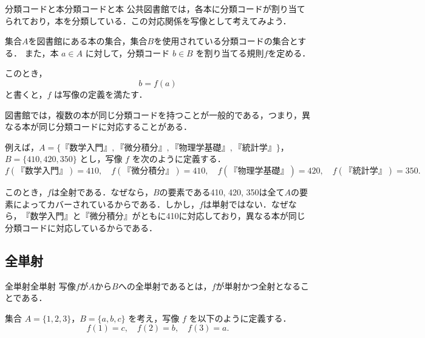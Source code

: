 \begin{example}{分類コードと本}{分類コードと本}
  公共図書館では，各本に分類コードが割り当てられており，本を分類している．この対応関係を写像として考えてみよう．

  集合$A$を図書館にある本の集合，集合$B$を使用されている分類コードの集合とする．
  また，本 $a \in A$ に対して，分類コード $b \in B$ を割り当てる規則$f$を定める．

  このとき，
  \[
    b = f(a)
  \]
  と書くと，$f$ は写像の定義を満たす．

  図書館では，複数の本が同じ分類コードを持つことが一般的である，つまり，異なる本が同じ分類コードに対応することがある．

  例えば，$A = \{\text{『数学入門』}, \text{『微分積分』}, \text{『物理学基礎』}, \text{『統計学』}\}$，
  $B = \{\text{410}, \text{420}, \text{350}\}$ とし，写像 $f$ を次のように定義する．
  \[
    f(\text{『数学入門』}) = 410, \quad
    f(\text{『微分積分』}) = 410, \quad
    f(\text{『物理学基礎』}) = 420, \quad
    f(\text{『統計学』}) = 350.
  \]

  このとき，$f$は全射である．なぜなら，$B$の要素である410, 420, 350は全て$A$の要素によってカバーされているからである．しかし，$f$は単射ではない．なぜなら，$\text{『数学入門』}$と$\text{『微分積分』}$がともに410に対応しており，異なる本が同じ分類コードに対応しているからである．

\end{example}


\subsection{全単射}

\begin{definition}{全単射}{全単射}
  写像$f$が$A$から$B$への全単射であるとは，$f$が単射かつ全射となることである．
\end{definition}

集合 $A = \{1, 2, 3\}$，$B = \{a, b, c\}$ を考え，写像 $f$ を以下のように定義する．
\[
  f(1) = c, \quad f(2) = b, \quad f(3) = a.
\]

